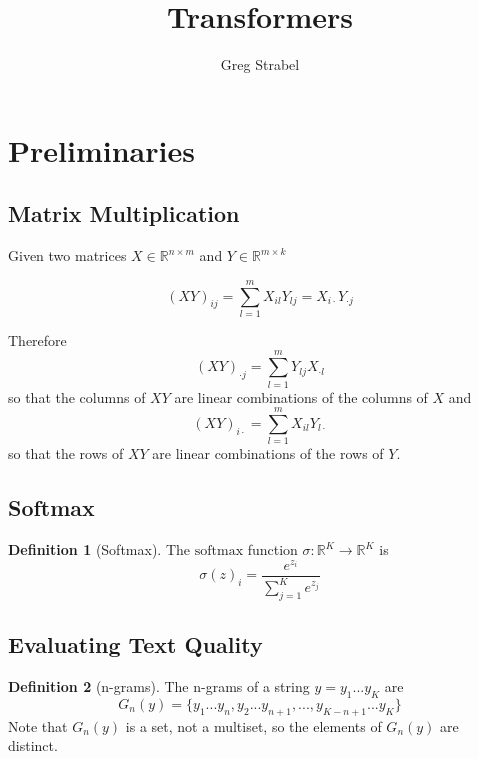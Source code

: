 \documentclass[11pt]{article}
\author{Greg Strabel}
\title{Transformers}
\theoremstyle{definition}
\newtheorem{definition}{Definition}[section]
\begin{document}
\maketitle

\section{Preliminaries}

\subsection{Matrix Multiplication}
Given two matrices $X \in \mathbb{R}^{n \times m}$ and $Y \in \mathbb{R}^{m \times k}$

\begin{equation}
\left( XY \right)_{ij} = \sum_{l=1}^m X_{il}Y_{lj} = X_{i \cdot} Y_{\cdot j}
\end{equation}

Therefore
\begin{equation}
\left( XY \right)_{\cdot j} = \sum_{l=1}^m Y_{lj} X_{\cdot l}
\end{equation}
so that the columns of $XY$ are linear combinations of the columns of $X$ and
\begin{equation}
\left( XY \right)_{i \cdot} = \sum_{l=1}^m X_{il} Y_{l \cdot}
\end{equation}
so that the rows of $XY$ are linear combinations of the rows of $Y$.

\subsection{Softmax}

\begin{definition}[Softmax] The $\mathrm{softmax}$ function $\sigma : \mathbb{R}^K \rightarrow \mathbb{R}^K$ is
\begin{equation}
\sigma(z)_i = \frac{e^{z_i}}{\sum_{j=1}^K e^{z_j}}
\end{equation}
\end{definition}

\subsection{Evaluating Text Quality}

\begin{definition}[n-grams] The n-grams of a string $y = y_1...y_K$ are
\begin{equation}
G_n(y) = \{ y_1...y_n, y_2...y_{n+1}, ... , y_{K-n+1}...y_K \}
\end{equation}
Note that $G_n(y)$ is a set, not a multiset, so the elements of $G_n(y)$ are distinct.
\end{definition}
\end{document}

